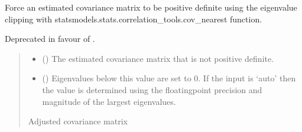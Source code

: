 \documentclass[letterpaper,10pt,english]{sphinxmanual}
\begin{document}
\begin{fulllineitems}
\label{\detokenize{misc:glomar_gridding.covariance_tools.perturb_cov_to_positive_definite}}
\pysigstartsignatures
\pysiglinewithargsret
{}
{\sphinxparamcomma {}}
{}
\pysigstopsignatures
\sphinxAtStartPar
Force an estimated covariance matrix to be positive definite using the
eigenvalue clipping with statsmodels.stats.correlation\_tools.cov\_nearest
function.

\sphinxAtStartPar
Deprecated in favour of
{\hyperref[\detokenize{misc:glomar_gridding.covariance_tools.simple_clipping}]{}}.
\begin{quote}\begin{description}
\begin{itemize}
\item {}
\sphinxAtStartPar
{} () \textendash{} The estimated covariance matrix that is not positive definite.

\item {}
\sphinxAtStartPar
{} () \textendash{} Eigenvalues below this value are set to 0. If the input is ‘auto’ then
the value is determined using the floating\sphinxhyphen{}point precision and magnitude
of the largest eigenvalues.

\end{itemize}

\sphinxAtStartPar
{} \textendash{} Adjusted covariance matrix

\sphinxAtStartPar
{}

\end{description}\end{quote}



\end{fulllineitems}
\end{document}
